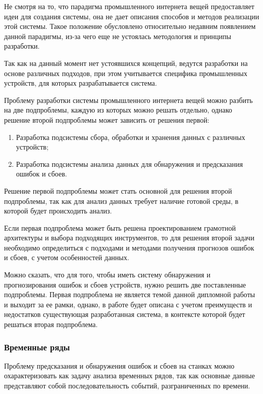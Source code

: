 Не смотря на то, что парадигма промышленного интернета вещей предоставляет идеи
для создания системы, она не дает описания способов и методов реализации этой системы.
Такое положение обусловлено относительно недавним появлением данной парадигмы,
из-за чего еще не устоялась методология и принципы разработки.

Так как на данный момент нет устоявшихся концепций,
ведутся разработки на основе различных подходов,
при этом учитывается специфика промышленных устройств,
для которых разрабатывается система.

Проблему разработки системы промышленного интернета вещей можно разбить на две подпроблемы,
каждую из которых можно решать отдельно, однако решение второй подпроблемы может зависить от решения первой:

\begin{enumerate}
    \item Разработка подсистемы сбора, обработки и хранения данных с различных устройств;
    \item Разработка подсистемы анализа данных для обнаружения и предсказания ошибок и сбоев.
\end{enumerate}

Решение первой подпроблемы может стать основной для решения второй подпроблемы,
так как для анализ данных требует наличие готовой среды, в которой
будет происходить анализ.

Если первая подпроблема может быть решена проектированием грамотной архитектуры и выбора подходящих инструментов,
то для решения второй задачи необходимо определиться с подходами и методами
получения прогнозов ошибок и сбоев, с учетом особенностей данных.

Можно сказать, что для того, чтобы иметь систему обнаружения и прогнозирования ошибок и сбоев устройств,
нужно решить две поставленные подпроблемы. Первая подпроблема не является темой данной дипломной работы
и выходит за ее рамки, однако, в работе будет описана с учетом преимуществ и недостатков существующая разработанная система,
в контексте которой будет решаться вторая подпроблема.

\subsubsection{Временные ряды}

Проблему предсказания и обнаружения ошибок и сбоев на станках можно охарактеризовать как задачу анализа временных рядов,
так как основные данные представляют собой последовательность событий,
разграниченных по времени.

